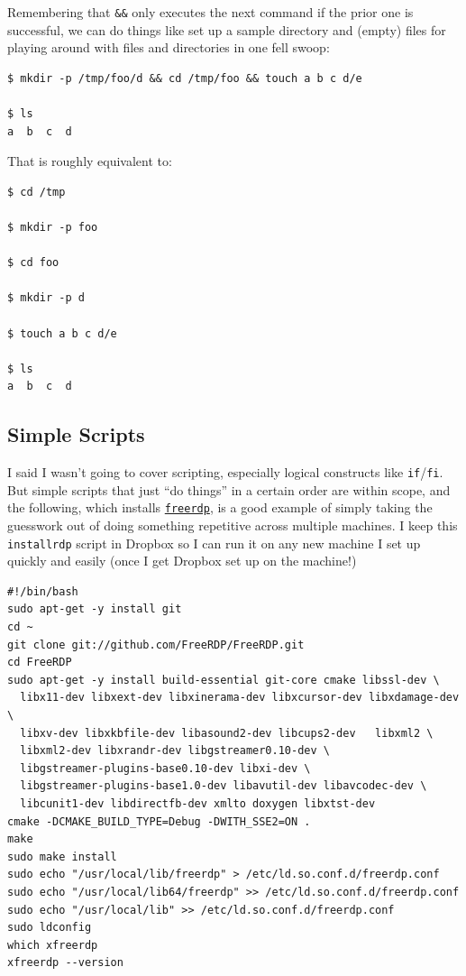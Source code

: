 \documentclass[10pt,]{book}
\numberwithin{figure}{chapter}
\begin{document}
Remembering that \texttt{\&\&} only executes the next command if the
prior one is successful, we can do things like set up a sample directory
and (empty) files for playing around with files and directories in one
fell swoop:

\begin{verbatim}
$ mkdir -p /tmp/foo/d && cd /tmp/foo && touch a b c d/e

$ ls
a  b  c  d
\end{verbatim}

That is roughly equivalent to:

\begin{verbatim}
$ cd /tmp

$ mkdir -p foo

$ cd foo

$ mkdir -p d

$ touch a b c d/e

$ ls
a  b  c  d
\end{verbatim}

\subsection{Simple Scripts}\label{simple-scripts}

I said I wasn't going to cover scripting, especially logical constructs
like \texttt{if}/\texttt{fi}. But simple scripts that just ``do things''
in a certain order are within scope, and the following, which installs
\href{https://github.com/freerdp/freerdp}{\texttt{freerdp}}, is a good
example of simply taking the guesswork out of doing something repetitive
across multiple machines. I keep this \texttt{installrdp} script in
Dropbox so I can run it on any new machine I set up quickly and easily
(once I get Dropbox set up on the machine!)

\begin{verbatim}
#!/bin/bash
sudo apt-get -y install git
cd ~
git clone git://github.com/FreeRDP/FreeRDP.git
cd FreeRDP
sudo apt-get -y install build-essential git-core cmake libssl-dev \
  libx11-dev libxext-dev libxinerama-dev libxcursor-dev libxdamage-dev \
  libxv-dev libxkbfile-dev libasound2-dev libcups2-dev   libxml2 \
  libxml2-dev libxrandr-dev libgstreamer0.10-dev \
  libgstreamer-plugins-base0.10-dev libxi-dev \
  libgstreamer-plugins-base1.0-dev libavutil-dev libavcodec-dev \
  libcunit1-dev libdirectfb-dev xmlto doxygen libxtst-dev
cmake -DCMAKE_BUILD_TYPE=Debug -DWITH_SSE2=ON .
make
sudo make install
sudo echo "/usr/local/lib/freerdp" > /etc/ld.so.conf.d/freerdp.conf
sudo echo "/usr/local/lib64/freerdp" >> /etc/ld.so.conf.d/freerdp.conf
sudo echo "/usr/local/lib" >> /etc/ld.so.conf.d/freerdp.conf
sudo ldconfig
which xfreerdp
xfreerdp --version
\end{verbatim}
\end{document}
